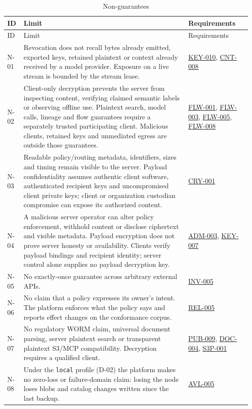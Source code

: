 \documentclass[11pt,a4paper]{article}
\newcommand{\code}[1]{{\small\nolinkurl{#1}}}
\newcommand{\rr}[1]{\hyperlink{req:#1}{#1}}
\begin{document}
\begin{longtable}{@{}P{0.07\textwidth}P{0.55\textwidth}P{0.27\textwidth}@{}}
\caption{Non-guarantees}\label{tab:nonguarantees}\\
\toprule ID & Limit & Requirements\\\midrule\endfirsthead
\toprule ID & Limit & Requirements\\\midrule\endhead
N-01 & Revocation does not recall bytes already emitted, exported keys, retained plaintext or context already received by a model provider. Exposure on a live stream is bounded by the stream lease. & \rr{KEY-010}, \rr{CNT-008}\\
N-02 & Client-only decryption prevents the server from inspecting content, verifying claimed semantic labels or observing offline use. Plaintext search, model calls, lineage and flow guarantees require a separately trusted participating client. Malicious clients, retained keys and unmediated egress are outside those guarantees. & \rr{FLW-001}, \rr{FLW-003}, \rr{FLW-005}, \rr{FLW-008}\\
N-03 & Readable policy/routing metadata, identifiers, sizes and timing remain visible to the server. Payload confidentiality assumes authentic client software, authenticated recipient keys and uncompromised client private keys; client or organization custodian compromise can expose its authorized content. & \rr{CRY-001}\\
N-04 & A malicious server operator can alter policy enforcement, withhold content or disclose ciphertext and visible metadata. Payload encryption does not prove server honesty or availability. Clients verify payload bindings and recipient identity; server control alone supplies no payload decryption key. & \rr{ADM-003}, \rr{KEY-007}\\
N-05 & No exactly-once guarantee across arbitrary external APIs. & \rr{INV-005}\\
N-06 & No claim that a policy expresses its owner's intent. The platform enforces what the policy says and reports effect changes on the conformance corpus. & \rr{REL-005}\\
N-07 & No regulatory WORM claim, universal document parsing, server plaintext search or transparent plaintext S3/MCP compatibility. Decryption requires a qualified client. & \rr{PUB-009}, \rr{DOC-004}, \rr{S3P-001}\\
N-08 & Under the \code{local} profile (D-02) the platform makes no zero-loss or failure-domain claim: losing the node loses blobs and catalog changes written since the last backup. & \rr{AVL-005}\\
\bottomrule
\end{longtable}
\end{document}
